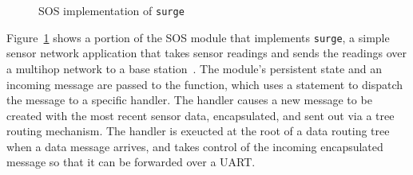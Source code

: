 \begin{figure}[t]

\caption{SOS implementation of {\tt surge}\label{fig:surge}}
\end{figure}

Figure~\ref{fig:surge} shows a portion of the SOS module that
implements {\tt surge}, a simple sensor network application that takes
sensor readings and sends the readings over a multihop network to a
base station~\cite{nesC}.  The module's persistent state and an
incoming message are passed to the  function,
which uses a  statement to dispatch the message to a
specific handler.  The  handler causes a new
message to be created with the most recent sensor data, encapsulated,
and sent out via a tree routing mechanism.  The
 handler is exeucted at the root of a data
routing tree when a data message arrives, and takes control of the
incoming encapsulated message so that it can be forwarded over a UART.


% 
% 

